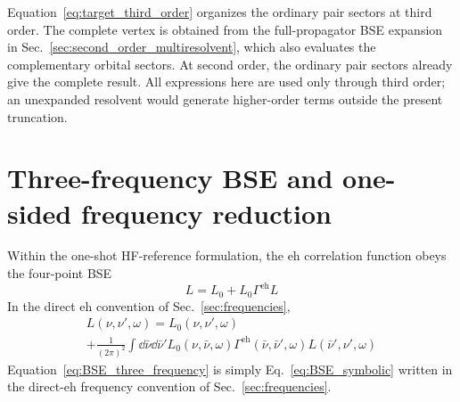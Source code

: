 \documentclass[aip,jcp,reprint,noshowkeys,superscriptaddress]{revtex4-1}
\newcommand{\eh}{\text{eh}}
\begin{document}
Equation~\eqref{eq:target_third_order} organizes the ordinary pair sectors
at third order. The complete vertex is obtained from the full-propagator
BSE expansion in Sec.~\ref{sec:second_order_multiresolvent}, which also
evaluates the complementary orbital sectors.
At second order, the ordinary pair sectors already give the complete result.
All expressions here are used only through third order; an unexpanded
resolvent would generate higher-order terms outside the present truncation.

\section{Three-frequency BSE and one-sided frequency reduction}
\label{sec:three_frequency_bse}

Within the one-shot HF-reference formulation, the $\eh$ correlation function obeys the
four-point BSE
\begin{equation}
	L
	=
	L_0
	+
	L_0 \Gamma^\eh L
	\label{eq:BSE_symbolic}
\end{equation}
In the direct $\eh$ convention of Sec.~\ref{sec:frequencies},
\begin{multline}
	L(\nu,\nu',\omega)
	=
	L_0(\nu,\nu',\omega)
	\\
	+
	\frac{1}{(2\pi)^2}
	\int \dd{\bar\nu}\dd{\bar\nu'}
	L_0(\nu,\bar\nu,\omega)
	\Gamma^\eh(\bar\nu,\bar\nu',\omega)
	L(\bar\nu',\nu',\omega)
	\label{eq:BSE_three_frequency}
\end{multline}
Equation~\eqref{eq:BSE_three_frequency} is simply
Eq.~\eqref{eq:BSE_symbolic} written in the direct-$\eh$ frequency convention
of Sec.~\ref{sec:frequencies}.
\end{document}
